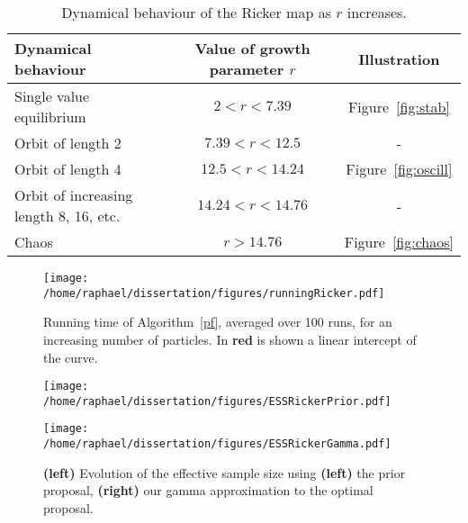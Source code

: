 \documentclass[12pt]{article}
\newcommand{\ra}[1]{\renewcommand{\arraystretch}{#1}}
\begin{document}
	\begin{table}[htb]
		\centering
		\ra{1.3}
		\begin{tabular}{@{}lcc@{}} \toprule
			Dynamical behaviour & Value of growth parameter $r$ &  Illustration \\ \midrule
			Single value equilibrium & $2<r<7.39$ & Figure~\ref{fig:stab}\\ 
			Orbit of length 2 & $7.39<r<12.5$ & - \\ 
			Orbit of length 4 & $12.5<r<14.24$ & Figure~\ref{fig:oscill}\\ 
			Orbit of increasing length 8, 16, etc. & $14.24<r<14.76$ & - \\ 
			Chaos &  $r>14.76$ &  Figure~\ref{fig:chaos} \\ \bottomrule
		\end{tabular}
		\caption{Dynamical behaviour of the Ricker map as $r$ increases.}
		\label{valuesr}
	\end{table}	
	

	\begin{figure}[htb]
		\centering
		\begin{minipage}{0.9\textwidth}
			\centering
			\texttt{[image: /home/raphael/dissertation/figures/runningRicker.pdf]}
		\end{minipage}
		\caption[Running time of the particle filter used on the Ricjer model.]{Running time of Algorithm~\ref{pf}, averaged over 100 runs, for an increasing number of particles. In \textbf{red} is shown a linear intercept of the curve.}
		\label{fig:runningRicker}
	\end{figure}

	\begin{figure}[htb]
		\centering
		\begin{minipage}{0.4\textwidth}
			\centering
			\texttt{[image: /home/raphael/dissertation/figures/ESSRickerPrior.pdf]}
		\end{minipage}
		\begin{minipage}{0.4\textwidth}
			\centering
			\texttt{[image: /home/raphael/dissertation/figures/ESSRickerGamma.pdf]}
		\end{minipage}
		\caption[ESS of the particle filter used for the Ricker model depending on what proposal is used]{\textbf{(left)} Evolution of the effective sample size using \textbf{(left)} the prior proposal, \textbf{(right)} our gamma approximation to the optimal proposal.}
		\label{fig:essRicker}
	\end{figure}
	
\end{document}
